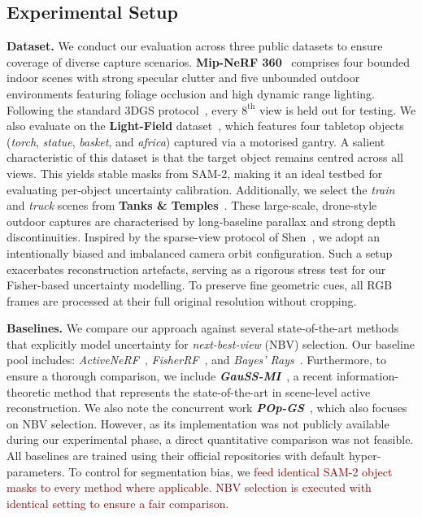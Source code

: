 \documentclass{egpubl}
\newcommand{\rev}[1]{\textcolor{darkred}{#1}}
\begin{document}
\subsection{Experimental Setup}
\noindent\textbf{Dataset.} \label{sec:Dataset}
We conduct our evaluation across three public datasets to ensure coverage of diverse capture scenarios.
\textbf{Mip-NeRF 360}~\cite{barron2022mipnerf360unboundedantialiased} comprises four bounded indoor scenes with strong specular clutter and five unbounded outdoor environments featuring foliage occlusion and high dynamic range lighting.
Following the standard 3DGS protocol~\cite{kerbl3DGaussianSplatting2023}, every $8^{\text{th}}$ view is held out for testing.
We also evaluate on the \textbf{Light-Field} dataset~\cite{10.1145/2876504}, which features four tabletop objects (\emph{torch}, \emph{statue}, \emph{basket}, and \emph{africa}) captured via a motorised gantry.
A salient characteristic of this dataset is that the target object remains centred across all views. This yields stable masks from SAM-2, making it an ideal testbed for evaluating per-object uncertainty calibration.
Additionally, we select the \emph{train} and \emph{truck} scenes from \textbf{Tanks \& Temples}~\cite{tank}. These large-scale, drone-style outdoor captures are characterised by long-baseline parallax and strong depth discontinuities.
Inspired by the sparse-view protocol of Shen~\cite{variationfor3dreconstruction}, we adopt an intentionally biased and imbalanced camera orbit configuration. Such a setup exacerbates reconstruction artefacts, serving as a rigorous stress test for our Fisher-based uncertainty modelling. To preserve fine geometric cues, all RGB frames are processed at their full original resolution without cropping.


\noindent\textbf{Baselines.} We compare our approach against several state-of-the-art methods that explicitly model uncertainty for \textit{next-best-view} (NBV) selection. Our baseline pool includes: \emph{ActiveNeRF}~\cite{panActiveNeRFLearningWhere2022}, \emph{FisherRF}~\cite{jiangFisherRFActiveView2024}, and \emph{Bayes’ Rays}~\cite{goli2023}. Furthermore, to ensure a thorough comparison, we include \textbf{\emph{GauSS-MI}}~\cite{xieGauSSMIGaussianSplatting2025}, a recent information-theoretic method that represents the state-of-the-art in scene-level active reconstruction. We also note the concurrent work \textbf{\emph{POp-GS}}~\cite{wilsonPOpGSNextBest2025a}, which also focuses on NBV selection. However, as its implementation was not publicly available during our experimental phase, a direct quantitative comparison was not feasible. All baselines are trained using their official repositories with default hyper-parameters. To control for segmentation bias, we \rev{feed identical SAM-2 object masks to every method where applicable. NBV selection is executed with identical setting to ensure a fair comparison}.

\end{document}
